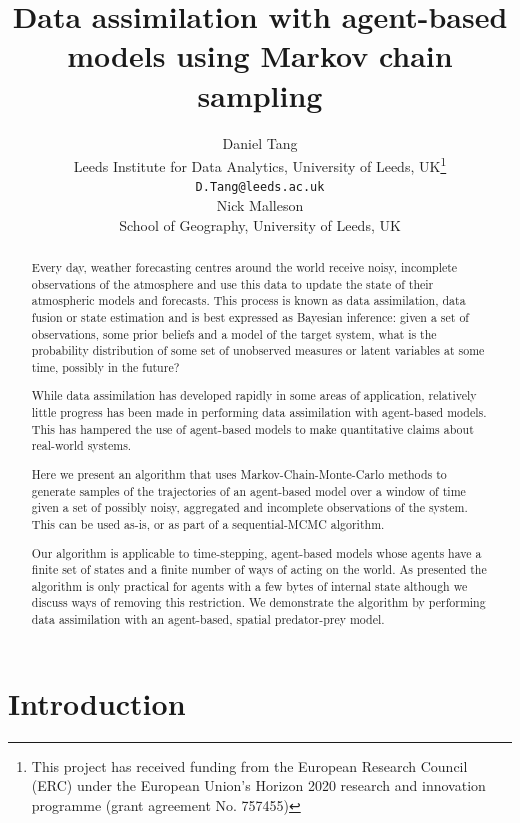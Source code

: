 \documentclass{article}
\title{Data assimilation with agent-based models using Markov chain sampling}
\author{
  Daniel Tang\\
    Leeds Institute for Data Analytics, University of Leeds, UK\thanks{This project has received funding from the European Research Council (ERC) under the European Union’s Horizon 2020 research and innovation programme (grant agreement No. 757455)}\\
  \texttt{D.Tang@leeds.ac.uk}\\
  \AND
  Nick Malleson\\
  School of Geography, University of Leeds, UK\\  
}
\begin{document}
\maketitle

\begin{abstract}
Every day, weather forecasting centres around the world receive noisy, incomplete observations of the atmosphere and use this data to update the state of their atmospheric models and forecasts. This process is known as data assimilation, data fusion or state estimation and is best expressed as Bayesian inference: given a set of observations, some prior beliefs and a model of the target system, what is the probability distribution of some set of unobserved measures or latent variables at some time, possibly in the future?

While data assimilation has developed rapidly in some areas of application, relatively little progress has been made in performing data assimilation with agent-based models. This has hampered the use of agent-based models to make quantitative claims about real-world systems.

Here we present an algorithm that uses Markov-Chain-Monte-Carlo methods to generate samples of the trajectories of an agent-based model over a window of time given a set of possibly noisy, aggregated and incomplete observations of the system. This can be used as-is, or as part of a sequential-MCMC algorithm.

Our algorithm is applicable to time-stepping, agent-based models whose agents have a finite set of states and a finite number of ways of acting on the world. As presented the algorithm is only practical for agents with a few bytes of internal state although we discuss ways of removing this restriction. We demonstrate the algorithm by performing data assimilation with an agent-based, spatial predator-prey model.
\end{abstract}


\section{Introduction}
\end{document}
